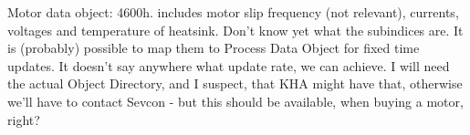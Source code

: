 
Motor data object: 4600h. includes motor slip frequency (not relevant), currents, voltages and temperature of heatsink. Don't know yet what the subindices are.
It is (probably) possible to map them to Process Data Object for fixed time updates. It doesn't say anywhere what update rate, we can achieve.
I will need the actual Object Directory, and I suspect, that KHA might have that, otherwise we'll have to contact Sevcon - but this should be available, when buying a motor, right?